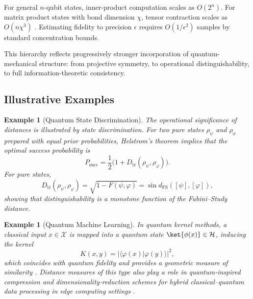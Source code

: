 \documentclass[aps,pra,reprint,nofootinbib,showpacs,superscriptaddress]{revtex4-1}
\newtheorem{example}[theorem]{Example}
\begin{document}
For general $n$-qubit states,
inner-product computation scales as $O(2^n)$.
For matrix product states with bond dimension $\chi$,
tensor contraction scales as $O(n\chi^3)$
\cite{Orus2014}.
Estimating fidelity to precision $\epsilon$
requires $O(1/\epsilon^2)$ samples by standard
concentration bounds.


This hierarchy reflects progressively stronger incorporation of
quantum-mechanical structure: from projective symmetry,
to operational distinguishability, to full
information-theoretic consistency.

\subsection{Illustrative Examples}
\begin{example}[Quantum State Discrimination]
    

The operational significance of distances is illustrated by
state discrimination. For two pure states $\rho_\psi$ and $\rho_\phi$
prepared with equal prior probabilities, Helstrom's theorem
\cite{helstrom1969quantum} implies that the optimal success probability is
\[
P_{\mathrm{succ}}
=
\frac12 \bigl(1 + D_{\mathrm{tr}}(\rho_\psi, \rho_\varphi)\bigr).
\]
For pure states,
\[
D_{\mathrm{tr}}(\rho_\psi, \rho_\varphi)
=
\sqrt{1-F(\psi,\varphi)}
=
\sin d_{\mathrm{FS}}([\psi],[\varphi]),
\]
showing that distinguishability is a monotone function of
the Fubini--Study distance.
\end{example}
\begin{example}[Quantum Machine Learning]
In quantum kernel methods, a classical input $x \in \mathcal{X}$ is
mapped into a quantum state $\ket{\phi(x)}\in\mathcal{H}$, inducing
the kernel
\[
K(x,y)=|\langle\varphi(x)|\varphi(y)\rangle|^2,
\]
which coincides with quantum fidelity and provides a geometric measure
of similarity \cite{Havlicek2019,Schuld2019}. Distance measures of this
type also play a role in quantum‐inspired compression and
dimensionality‐reduction schemes for hybrid classical–quantum data
processing in edge computing settings \cite{bagherian2023classical}.
\end{example}
\end{document}
